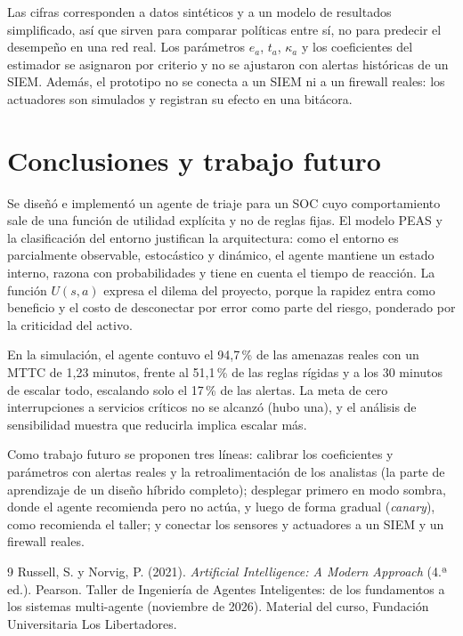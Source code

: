 \documentclass[11pt,a4paper]{article}
\begin{document}
Las cifras corresponden a datos sintéticos y a un modelo de resultados simplificado, así que sirven para comparar políticas entre sí, no para predecir el desempeño en una red real. Los parámetros $e_a$, $t_a$, $\kappa_a$ y los coeficientes del estimador se asignaron por criterio y no se ajustaron con alertas históricas de un SIEM. Además, el prototipo no se conecta a un SIEM ni a un firewall reales: los actuadores son simulados y registran su efecto en una bitácora.

\section{Conclusiones y trabajo futuro}\label{sec:conclusiones}

Se diseñó e implementó un agente de triaje para un SOC cuyo comportamiento sale de una función de utilidad explícita y no de reglas fijas. El modelo PEAS y la clasificación del entorno justifican la arquitectura: como el entorno es parcialmente observable, estocástico y dinámico, el agente mantiene un estado interno, razona con probabilidades y tiene en cuenta el tiempo de reacción. La función $U(s,a)$ expresa el dilema del proyecto, porque la rapidez entra como beneficio y el costo de desconectar por error como parte del riesgo, ponderado por la criticidad del activo.

En la simulación, el agente contuvo el 94{,}7\,\% de las amenazas reales con un MTTC de 1{,}23 minutos, frente al 51{,}1\,\% de las reglas rígidas y a los 30 minutos de escalar todo, escalando solo el 17\,\% de las alertas. La meta de cero interrupciones a servicios críticos no se alcanzó (hubo una), y el análisis de sensibilidad muestra que reducirla implica escalar más.

Como trabajo futuro se proponen tres líneas: calibrar los coeficientes y parámetros con alertas reales y la retroalimentación de los analistas (la parte de aprendizaje de un diseño híbrido completo); desplegar primero en modo sombra, donde el agente recomienda pero no actúa, y luego de forma gradual (\emph{canary}), como recomienda el taller; y conectar los sensores y actuadores a un SIEM y un firewall reales.

\begin{thebibliography}{9}
 Russell, S. y Norvig, P. (2021). \emph{Artificial Intelligence: A Modern Approach} (4.ª ed.). Pearson.
 Taller de Ingeniería de Agentes Inteligentes: de los fundamentos a los sistemas multi-agente (noviembre de 2026). Material del curso, Fundación Universitaria Los Libertadores.
\end{thebibliography}
\end{document}
